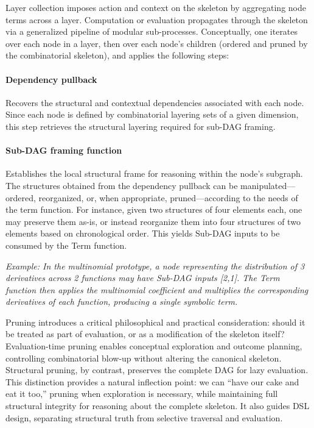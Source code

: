 \documentclass[12pt]{article}
\begin{document}
Layer collection imposes action and context on the skeleton by aggregating node terms across a layer. Computation or evaluation propagates through the skeleton via a generalized pipeline of modular sub-processes. Conceptually, one iterates over each node in a layer, then over each node's children (ordered and pruned by the combinatorial skeleton), and applies the following steps:

\paragraph{Dependency pullback} Recovers the structural and contextual dependencies associated with each node. Since each node is defined by combinatorial layering sets of a given dimension, this step retrieves the structural layering required for sub-DAG framing.

\paragraph{Sub-DAG framing function} Establishes the local structural frame for reasoning within the node’s subgraph. The structures obtained from the dependency pullback can be manipulated—ordered, reorganized, or, when appropriate, pruned—according to the needs of the term function. For instance, given two structures of four elements each, one may preserve them as-is, or instead reorganize them into four structures of two elements based on chronological order. This yields Sub-DAG inputs to be consumed by the Term function.

\textit{Example: In the multinomial prototype, a node representing the distribution of 3 derivatives across 2 functions may have Sub-DAG inputs [2,1]. The Term function then applies the multinomial coefficient and multiplies the corresponding derivatives of each function, producing a single symbolic term.}

Pruning introduces a critical philosophical and practical consideration: should it be treated as part of evaluation, or as a modification of the skeleton itself? Evaluation-time pruning enables conceptual exploration and outcome planning, controlling combinatorial blow-up without altering the canonical skeleton. Structural pruning, by contrast, preserves the complete DAG for lazy evaluation. This distinction provides a natural inflection point: we can “have our cake and eat it too,” pruning when exploration is necessary, while maintaining full structural integrity for reasoning about the complete skeleton. It also guides DSL design, separating structural truth from selective traversal and evaluation.
\end{document}
